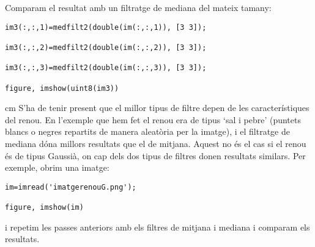 \documentclass{article}
\begin{document}
Comparam el resultat amb un filtratge de mediana del mateix tamany:

\begin{verbatim}
im3(:,:,1)=medfilt2(double(im(:,:,1)), [3 3]);

im3(:,:,2)=medfilt2(double(im(:,:,2)), [3 3]);

im3(:,:,3)=medfilt2(double(im(:,:,3)), [3 3]);

figure, imshow(uint8(im3))
\end{verbatim}


 cm
S'ha de tenir present que el millor tipus de filtre depen de les característiques
del renou. En l'exemple que hem fet el renou era de tipus `sal i pebre' (puntets blancs o
negres repartits de manera aleatòria per la imatge), i el filtratge de mediana
dóna millors resultats que el de mitjana. 
Aquest no és el cas si el renou és de tipus Gaussià, on cap dels dos tipus de filtres
donen resultats similars. Per exemple, obrim una imatge:

\begin{verbatim}
im=imread('imatgerenouG.png');

figure, imshow(im)
\end{verbatim}


i repetim les passes anteriors amb els filtres de mitjana i mediana i comparam els resultats.
\end{document}
